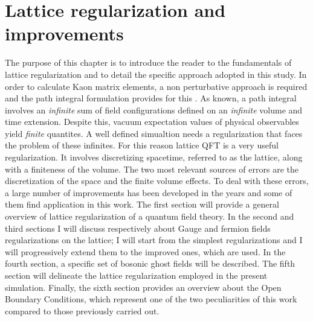 \documentclass[english, LaM, oneside, noexaminfo]{sapthesis}
\newcommand{\obc}{Open Boundary Conditions}
\begin{document}
\chapter{Lattice regularization and improvements}\label{ch:lattice-regularization}
\lettrine[lines=2, findent=3pt, nindent=0pt]{T}{}he purpose of this chapter is to introduce the reader to the fundamentals of lattice regularization and to detail the specific approach adopted in this study.
\newline
In order to calculate Kaon matrix elements, a non perturbative approach is required and the path integral formulation provides for this \cite{Itzykson-Zuber}.
As known, a path integral involves an \textit{infinite} sum of field configurations defined on an \textit{infinite} volume and time extension.
Despite this, vacuum expectation values of physical observables yield \textit{finite} quantites.
A well defined simualtion needs a regularization that faces the problem of these infinites.
For this reason lattice QFT is a very useful regularization.
It involves discretizing spacetime, referred to as the lattice, along with a finiteness of the volume.
The two most relevant sources of errors are the discretization of the space and the finite volume effects.
To deal with these errors, a large number of improvements has been developed in the years and some of them find application in this work.
\newline
The first section will provide a general overview of lattice regularization of a quantum field theory.
In the second and third sections I will discuss respectively about Gauge and fermion fields regularizations on the lattice;
I will start from the simplest regularizations and I will progressively extend them to the improved ones, which are used.
In the fourth section, a specific set of bosonic ghost fields will be described.
The fifth section will delineate the lattice regularization employed in the present simulation.
Finally, the sixth section provides an overview about the \obc, which represent one of the two peculiarities of this work compared to those previously carried out.
\end{document}
